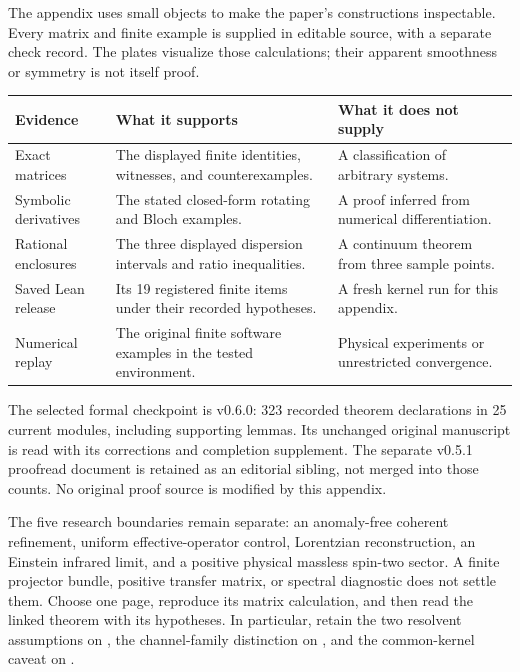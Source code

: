 The appendix uses small objects to make the paper's constructions inspectable. Every matrix and finite example is supplied in editable source, with a separate check record. The plates visualize those calculations; their apparent smoothness or symmetry is not itself proof.
\par\vspace{4pt}
\begin{tabularx}{\linewidth}{@{}p{.24\linewidth}YY@{}}
\toprule
Evidence & What it supports & What it does not supply\\\midrule
Exact matrices & The displayed finite identities, witnesses, and counterexamples. & A classification of arbitrary systems.\\
Symbolic derivatives & The stated closed-form rotating and Bloch examples. & A proof inferred from numerical differentiation.\\
Rational enclosures & The three displayed dispersion intervals and ratio inequalities. & A continuum theorem from three sample points.\\
Saved Lean release & Its 19 registered finite items under their recorded hypotheses. & A fresh kernel run for this appendix.\\
Numerical replay & The original finite software examples in the tested environment. & Physical experiments or unrestricted convergence.\\\bottomrule
\end{tabularx}
The selected formal checkpoint is v0.6.0: 323 recorded theorem declarations in 25 current modules, including supporting lemmas. Its unchanged original manuscript is read with its corrections and completion supplement. The separate v0.5.1 proofread document is retained as an editorial sibling, not merged into those counts. No original proof source is modified by this appendix.

The five research boundaries remain separate: an anomaly-free coherent refinement, uniform effective-operator control, Lorentzian reconstruction, an Einstein infrared limit, and a positive physical massless spin-two sector. A finite projector bundle, positive transfer matrix, or spectral diagnostic does not settle them.
Choose one page, reproduce its matrix calculation, and then read the linked theorem with its hypotheses. In particular, retain the two resolvent assumptions on , the channel-family distinction on , and the common-kernel caveat on .
